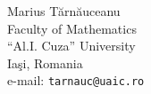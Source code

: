 \documentclass[12pt]{article}
\newcommand{\0}{{\leqno}}
\begin{document}
\hfill
\begin{minipage}[t]{5cm}
Marius T\u arn\u auceanu \\
Faculty of  Mathematics \\
``Al.I. Cuza'' University \\
Ia\c si, Romania \\
e-mail: {\tt tarnauc@uaic.ro}
\end{minipage}
\end{document}
